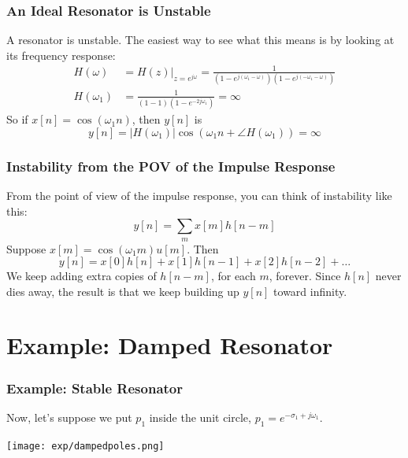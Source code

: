 \documentclass{beamer}
\begin{document}
\begin{frame}
  \centerline{}
\end{frame}

\begin{frame}
  \frametitle{An Ideal  Resonator is Unstable}

  A resonator is unstable.  The easiest way to see what this means is
  by looking at its frequency response:
  \begin{align*}
    H(\omega) &= H(z)\vert_{z=e^{j\omega}} = \frac{1}{(1-e^{j(\omega_1-\omega)})(1-e^{j(-\omega_1-\omega)})}\\
    H(\omega_1) &= \frac{1}{(1-1)(1-e^{-2j\omega_1})} = \infty
  \end{align*}
  So if $x[n]=\cos(\omega_1 n)$, then $y[n]$ is
  \begin{displaymath}
    y[n] = |H(\omega_1)|\cos\left(\omega_1 n+\angle H(\omega_1)\right) = \infty
  \end{displaymath}
\end{frame}

\begin{frame}
  \centerline{}
\end{frame}

\begin{frame}
  \frametitle{Instability from the POV of the Impulse Response}
  From the point of view of the impulse response, you can think of instability like this:
  \[
  y[n] = \sum_m x[m]h[n-m]
  \]
  Suppose $x[m] = \cos(\omega_1 m)u[m]$.   Then
  \[
  y[n] = x[0]h[n] + x[1]h[n-1] + x[2]h[n-2] + \ldots
  \]
  We keep adding extra copies of $h[n-m]$, for each $m$, forever.
  Since $h[n]$ never dies away, the result is that we keep building up
  $y[n]$ toward infinity.
\end{frame}

\begin{frame}
  \centerline{}
\end{frame}
  
\section[Damped]{Example: Damped Resonator}
\setcounter{subsection}{1}

\begin{frame}
  \frametitle{Example: Stable Resonator}

  Now, let's suppose we put $p_1$ inside the unit
  circle, $p_1=e^{-\sigma_1+j\omega_1}$.

  \centerline{\texttt{[image: exp/dampedpoles.png]}}
\end{frame}
\end{document}
